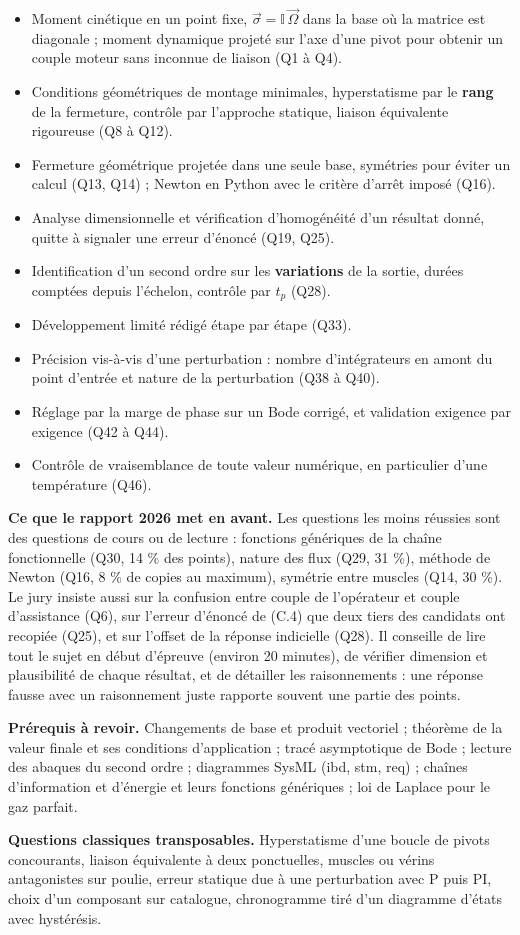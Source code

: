 \documentclass[11pt,a4paper]{article}
\providecommand{\tightlist}{\setlength{\itemsep}{0pt}\setlength{\parskip}{0pt}}
\begin{document}
\begin{itemize}
\tightlist
\item
  Moment cinétique en un point fixe, \(\vec\sigma=\mathbb I\,\vec\Omega\) dans la base où la matrice est diagonale ; moment dynamique projeté sur l'axe d'une pivot pour obtenir un couple moteur sans inconnue de liaison (Q1 à Q4).
\item
  Conditions géométriques de montage minimales, hyperstatisme par le \textbf{rang} de la fermeture, contrôle par l'approche statique, liaison équivalente rigoureuse (Q8 à Q12).
\item
  Fermeture géométrique projetée dans une seule base, symétries pour éviter un calcul (Q13, Q14) ; Newton en Python avec le critère d'arrêt imposé (Q16).
\item
  Analyse dimensionnelle et vérification d'homogénéité d'un résultat donné, quitte à signaler une erreur d'énoncé (Q19, Q25).
\item
  Identification d'un second ordre sur les \textbf{variations} de la sortie, durées comptées depuis l'échelon, contrôle par \(t_p\) (Q28).
\item
  Développement limité rédigé étape par étape (Q33).
\item
  Précision vis-à-vis d'une perturbation : nombre d'intégrateurs en amont du point d'entrée et nature de la perturbation (Q38 à Q40).
\item
  Réglage par la marge de phase sur un Bode corrigé, et validation exigence par exigence (Q42 à Q44).
\item
  Contrôle de vraisemblance de toute valeur numérique, en particulier d'une température (Q46).
\end{itemize}

\textbf{Ce que le rapport 2026 met en avant.} Les questions les moins réussies sont des questions de cours ou de lecture : fonctions génériques de la chaîne fonctionnelle (Q30, 14 \% des points), nature des flux (Q29, 31 \%), méthode de Newton (Q16, 8 \% de copies au maximum), symétrie entre muscles (Q14, 30 \%). Le jury insiste aussi sur la confusion entre couple de l'opérateur et couple d'assistance (Q6), sur l'erreur d'énoncé de (C.4) que deux tiers des candidats ont recopiée (Q25), et sur l'offset de la réponse indicielle (Q28). Il conseille de lire tout le sujet en début d'épreuve (environ 20 minutes), de vérifier dimension et plausibilité de chaque résultat, et de détailler les raisonnements : une réponse fausse avec un raisonnement juste rapporte souvent une partie des points.

\textbf{Prérequis à revoir.} Changements de base et produit vectoriel ; théorème de la valeur finale et ses conditions d'application ; tracé asymptotique de Bode ; lecture des abaques du second ordre ; diagrammes SysML (ibd, stm, req) ; chaînes d'information et d'énergie et leurs fonctions génériques ; loi de Laplace pour le gaz parfait.

\textbf{Questions classiques transposables.} Hyperstatisme d'une boucle de pivots concourants, liaison équivalente à deux ponctuelles, muscles ou vérins antagonistes sur poulie, erreur statique due à une perturbation avec P puis PI, choix d'un composant sur catalogue, chronogramme tiré d'un diagramme d'états avec hystérésis.
\end{document}
